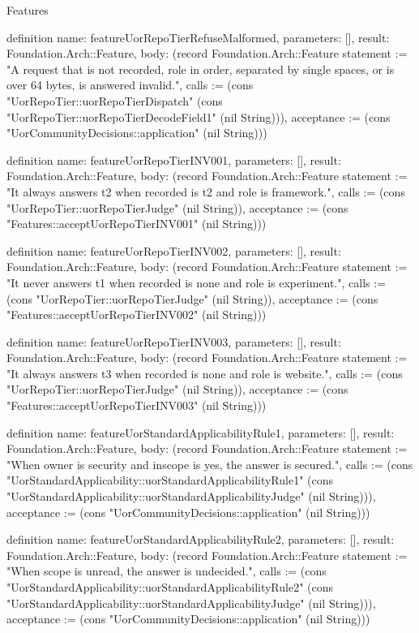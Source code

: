 \begin{lexlean}{Features}
\begin{semanticmodule}
definition{
  name: featureUorRepoTierRefuseMalformed,
  parameters: [],
  result: Foundation.Arch::Feature,
  body: (record Foundation.Arch::Feature {statement := "A request that is not recorded, role in order, separated by single spaces, or is over 64 bytes, is answered invalid.", calls := (cons "UorRepoTier::uorRepoTierDispatch" (cons "UorRepoTier::uorRepoTierDecodeField1" (nil String))), acceptance := (cons "UorCommunityDecisions::application" (nil String))})
}

definition{
  name: featureUorRepoTierINV001,
  parameters: [],
  result: Foundation.Arch::Feature,
  body: (record Foundation.Arch::Feature {statement := "It always answers t2 when recorded is t2 and role is framework.", calls := (cons "UorRepoTier::uorRepoTierJudge" (nil String)), acceptance := (cons "Features::acceptUorRepoTierINV001" (nil String))})
}

definition{
  name: featureUorRepoTierINV002,
  parameters: [],
  result: Foundation.Arch::Feature,
  body: (record Foundation.Arch::Feature {statement := "It never answers t1 when recorded is none and role is experiment.", calls := (cons "UorRepoTier::uorRepoTierJudge" (nil String)), acceptance := (cons "Features::acceptUorRepoTierINV002" (nil String))})
}

definition{
  name: featureUorRepoTierINV003,
  parameters: [],
  result: Foundation.Arch::Feature,
  body: (record Foundation.Arch::Feature {statement := "It always answers t3 when recorded is none and role is website.", calls := (cons "UorRepoTier::uorRepoTierJudge" (nil String)), acceptance := (cons "Features::acceptUorRepoTierINV003" (nil String))})
}

definition{
  name: featureUorStandardApplicabilityRule1,
  parameters: [],
  result: Foundation.Arch::Feature,
  body: (record Foundation.Arch::Feature {statement := "When owner is security and inscope is yes, the answer is secured.", calls := (cons "UorStandardApplicability::uorStandardApplicabilityRule1" (cons "UorStandardApplicability::uorStandardApplicabilityJudge" (nil String))), acceptance := (cons "UorCommunityDecisions::application" (nil String))})
}

definition{
  name: featureUorStandardApplicabilityRule2,
  parameters: [],
  result: Foundation.Arch::Feature,
  body: (record Foundation.Arch::Feature {statement := "When scope is unread, the answer is undecided.", calls := (cons "UorStandardApplicability::uorStandardApplicabilityRule2" (cons "UorStandardApplicability::uorStandardApplicabilityJudge" (nil String))), acceptance := (cons "UorCommunityDecisions::application" (nil String))})
}


\end{semanticmodule}
\end{lexlean}
